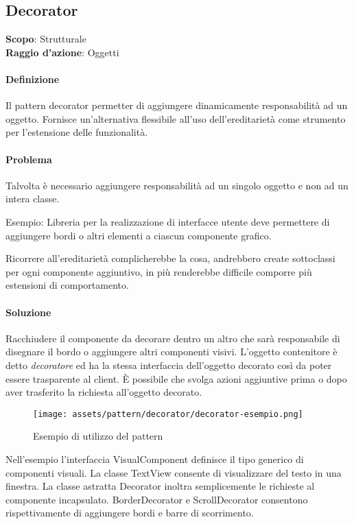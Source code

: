 \subsection{Decorator}
\label{decorator}

\textbf{Scopo}: Strutturale \\
\textbf{Raggio d'azione}: Oggetti

\paragraph{Definizione} Il pattern decorator permetter di aggiungere dinamicamente responsabilità ad un oggetto. Fornisce un'alternativa flessibile all'uso dell'ereditarietà come strumento per l'estensione delle funzionalità.

\paragraph{Problema} Talvolta è necessario aggiungere responsabilità ad un singolo oggetto e non ad un intera classe.

Esempio: Libreria per la realizzazione di interfacce utente deve permettere di aggiungere bordi o altri elementi a ciascun componente grafico.

Ricorrere all'ereditarietà complicherebbe la cosa, andrebbero create sottoclassi per ogni componente aggiuntivo, in più renderebbe difficile comporre più estensioni di comportamento.

\paragraph{Soluzione} Racchiudere il componente da decorare dentro un altro che sarà responsabile di disegnare il bordo o aggiungere altri componenti visivi. L'oggetto contenitore è detto \textit{decoratore} ed ha la stessa interfaccia dell'oggetto decorato così da poter essere trasparente al client. È possibile che svolga azioni aggiuntive prima o dopo aver trasferito la richiesta all'oggetto decorato.

\begin{figure}[H]
    \centering
    \texttt{[image: assets/pattern/decorator/decorator-esempio.png]}
    \caption{Esempio di utilizzo del pattern}
\end{figure}

Nell'esempio l'interfaccia VisualComponent definisce il tipo generico di componenti visuali. La classe TextView consente di visualizzare del testo in una finestra. La classe astratta Decorator inoltra semplicemente le richieste al componente incapsulato. BorderDecorator e ScrollDecorator consentono rispettivamente di aggiungere bordi e barre di scorrimento.

